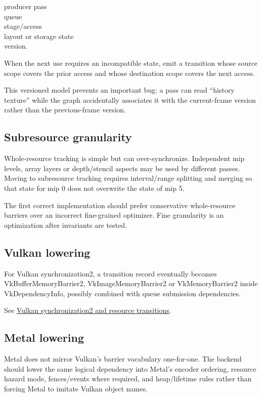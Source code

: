 producer pass\\
queue\\
stage/access\\
layout or storage state\\
version.

When the next use requires an incompatible state, emit a transition whose source scope covers the prior access and whose destination scope covers the next access.

This versioned model prevents an important bug: a pass can read ``history texture'' while the graph accidentally associates it with the current-frame version rather than the previous-frame version.

\subsection{Subresource granularity}\label{appendix-0fc95374cb7e-subresource-granularity}

Whole-resource tracking is simple but can over-synchronize. Independent mip levels, array layers or depth/stencil aspects may be used by different passes. Moving to subresource tracking requires interval/range splitting and merging so that state for mip 0 does not overwrite the state of mip 5.

The first correct implementation should prefer conservative whole-resource barriers over an incorrect fine-grained optimizer. Fine granularity is an optimization after invariants are tested.

\subsection{Vulkan lowering}\label{appendix-0fc95374cb7e-vulkan-lowering}

For Vulkan synchronization2, a transition record eventually becomes VkBufferMemoryBarrier2, VkImageMemoryBarrier2 or VkMemoryBarrier2 inside VkDependencyInfo, possibly combined with queue submission dependencies.

See \hyperref[appendix-f15ce0d9c170]{Vulkan synchronization2 and resource transitions}.

\subsection{Metal lowering}\label{appendix-0fc95374cb7e-metal-lowering}

Metal does not mirror Vulkan's barrier vocabulary one-for-one. The backend should lower the same logical dependency into Metal's encoder ordering, resource hazard mode, fences/events where required, and heap/lifetime rules rather than forcing Metal to imitate Vulkan object names.

